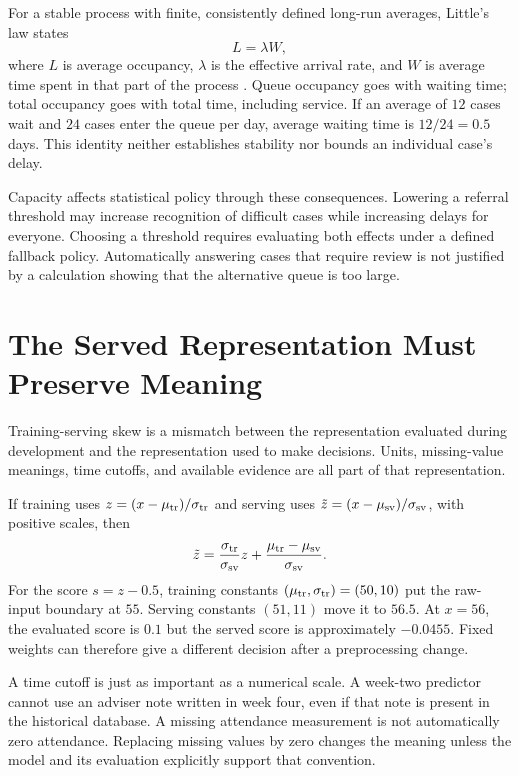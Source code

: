 For a stable process with finite, consistently defined long-run averages, Little's law states
\[
L=\lambda W,
\]
where $L$ is average occupancy, $\lambda$ is the effective arrival rate, and $W$ is average time spent in that part of the process \citep{little1961}. Queue occupancy goes with waiting time; total occupancy goes with total time, including service. If an average of $12$ cases wait and $24$ cases enter the queue per day, average waiting time is $12/24=0.5$ days. This identity neither establishes stability nor bounds an individual case's delay.

Capacity affects statistical policy through these consequences. Lowering a referral threshold may increase recognition of difficult cases while increasing delays for everyone. Choosing a threshold requires evaluating both effects under a defined fallback policy. Automatically answering cases that require review is not justified by a calculation showing that the alternative queue is too large.

\section{The Served Representation Must Preserve Meaning}

Training-serving skew is a mismatch between the representation evaluated during development and the representation used to make decisions. Units, missing-value meanings, time cutoffs, and available evidence are all part of that representation.

If training uses $z=(x-\mu_{\rm tr})/\sigma_{\rm tr}$ and serving uses $\tilde z=(x-\mu_{\rm sv})/\sigma_{\rm sv}$, with positive scales, then
\[
\tilde z=
\frac{\sigma_{\rm tr}}{\sigma_{\rm sv}}z+
\frac{\mu_{\rm tr}-\mu_{\rm sv}}{\sigma_{\rm sv}}.
\]
For the score $s=z-0.5$, training constants $(\mu_{\rm tr},\sigma_{\rm tr})=(50,10)$ put the raw-input boundary at $55$. Serving constants $(51,11)$ move it to $56.5$. At $x=56$, the evaluated score is $0.1$ but the served score is approximately $-0.0455$. Fixed weights can therefore give a different decision after a preprocessing change.

A time cutoff is just as important as a numerical scale. A week-two predictor cannot use an adviser note written in week four, even if that note is present in the historical database. A missing attendance measurement is not automatically zero attendance. Replacing missing values by zero changes the meaning unless the model and its evaluation explicitly support that convention.

